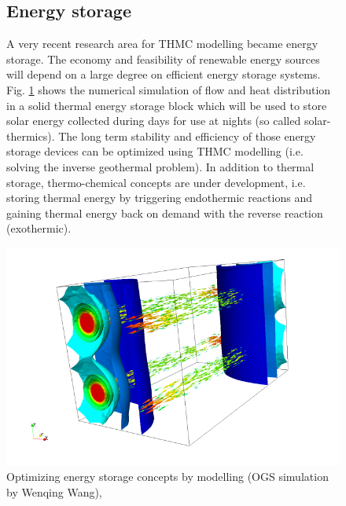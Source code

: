 \begin{figure}[!htb]
\begin{minipage}[t]{0.48\textwidth}
\subsection{Energy storage}

A very recent research area for THMC modelling became energy storage. The economy and feasibility of renewable energy sources will depend on a large degree on efficient energy storage systems. Fig. \ref{fig:apl6} shows the numerical simulation of flow and heat distribution in a solid thermal energy storage block which will be used to store solar energy collected during days for use at nights (so called solar-thermics). The long term stability and efficiency of those energy storage devices can be optimized using THMC modelling (i.e. solving the inverse geothermal problem). In addition to thermal storage, thermo-chemical concepts are under development, i.e. storing thermal energy by triggering endothermic reactions and gaining thermal energy back on demand with the reverse reaction (exothermic).
\end{minipage}
\hspace{0.02\textwidth}
\begin{minipage}[t]{0.48\textwidth}
\vspace{1.5cm}
\includegraphics[scale=0.3]{figures/intro5}
\caption{Optimizing energy storage concepts by modelling (OGS simulation by Wenqing Wang), \cite{HGFEnergy:2010}}
\label{fig:apl6}
\end{minipage}
\end{figure}
